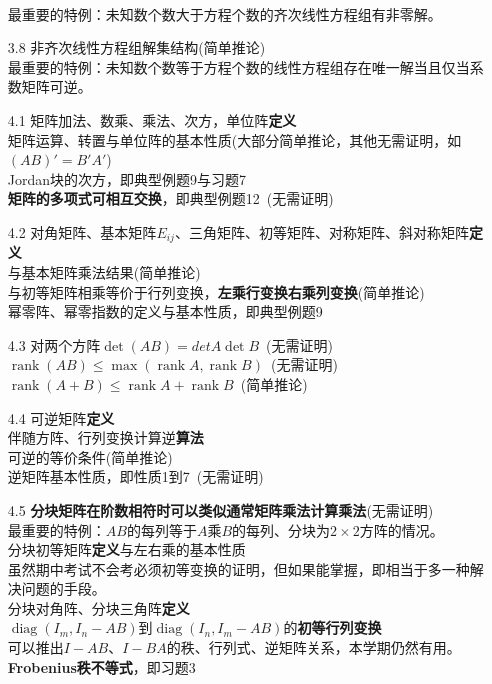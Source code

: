 \documentclass[a4paper,UTF8,fontset=windows,AutoFakeBold]{ctexart}
\DeclareMathOperator{\diag}{diag}
\DeclareMathOperator{\rank}{rank}
\newcommand*{\note}{\noindent *}
\begin{document}
\begin{enumerate}
    \\\note 最重要的特例：未知数个数大于方程个数的齐次线性方程组有非零解。
    \item[3.8] 非齐次线性方程组解集结构(简单推论)
    \\\note 最重要的特例：未知数个数等于方程个数的线性方程组存在唯一解当且仅当系数矩阵可逆。
    \item[4.1] 矩阵加法、数乘、乘法、次方，单位阵\textbf{定义}
    \\矩阵运算、转置与单位阵的基本性质(大部分简单推论，其他无需证明，如$(AB)'=B'A'$)
    \\Jordan块的次方，即典型例题9与习题7
    \\\textbf{矩阵的多项式可相互交换}，即典型例题12\ (无需证明)
    \item[4.2] 对角矩阵、基本矩阵$E_{ij}$、三角矩阵、初等矩阵、对称矩阵、斜对称矩阵\textbf{定义}
    \\与基本矩阵乘法结果(简单推论)
    \\与初等矩阵相乘等价于行列变换，\textbf{左乘行变换右乘列变换}(简单推论)
    \\幂零阵、幂零指数的定义与基本性质，即典型例题9
    \item[4.3] 对两个方阵$\det(AB)=det A\det B$\ (无需证明)
    \\$\rank(AB)\le\max(\rank A,\rank B)$\ (无需证明)
    \\$\rank(A+B)\le\rank A+\rank B$\ (简单推论)
    \item[4.4] 可逆矩阵\textbf{定义}
    \\伴随方阵、行列变换计算逆\textbf{算法}
    \\可逆的等价条件(简单推论)
    \\逆矩阵基本性质，即性质1到7\ (无需证明)
    \item[4.5] \textbf{分块矩阵在阶数相符时可以类似通常矩阵乘法计算乘法}(无需证明)
    \\\note 最重要的特例：$AB$的每列等于$A$乘$B$的每列、分块为$2\times 2$方阵的情况。
    \\分块初等矩阵\textbf{定义}与左右乘的基本性质
    \\\note 虽然期中考试不会考必须初等变换的证明，但如果能掌握，即相当于多一种解决问题的手段。
    \\分块对角阵、分块三角阵\textbf{定义}
    \\$\diag(I_m,I_n-AB)$到$\diag(I_n,I_m-AB)$的\textbf{初等行列变换}
    \\\note 可以推出$I-AB$、$I-BA$的秩、行列式、逆矩阵关系，本学期仍然有用。
    \\\textbf{Frobenius秩不等式}，即习题3

\end{enumerate}
\end{document}
